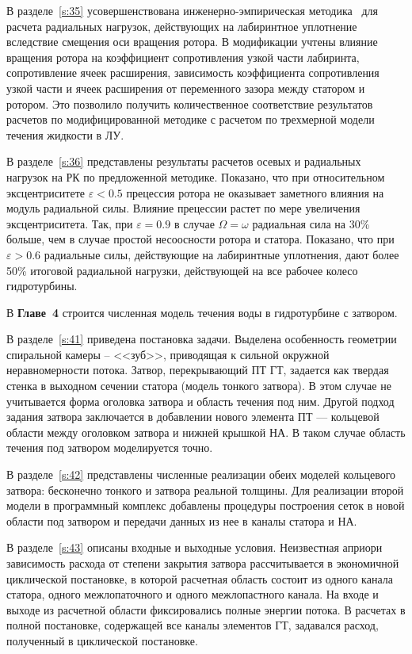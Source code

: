 В разделе~\ref{s:35} усовершенствована инженерно-эмпирическая методика~\cite{lomakin} для расчета радиальных
нагрузок, действующих на лабиринтное уплотнение вследствие смещения оси вращения ротора. В модификации 
учтены влияние вращения ротора на коэффициент сопротивления узкой части лабиринта, сопротивление 
ячеек расширения, зависимость коэффициента сопротивления узкой части и ячеек расширения от переменного зазора 
между статором и ротором. Это позволило получить количественное соответствие результатов 
расчетов по модифицированной методике с расчетом по трехмерной модели течения жидкости в ЛУ.

В разделе~\ref{s:36} представлены результаты расчетов осевых и радиальных нагрузок на РК по предложенной 
методике. Показано, что при относительном эксцентриситете $\varepsilon < 0.5$ прецессия ротора не оказывает 
заметного влияния на модуль радиальной силы. Влияние прецессии растет по мере увеличения эксцентриситета. 
Так, при $\varepsilon = 0.9$ в случае $\Omega = \omega$ радиальная сила на 30\% больше, чем в случае простой 
несоосности ротора и статора. Показано, что при $\varepsilon > 0.6$ радиальные силы, действующие на 
лабиринтные уплотнения, дают более 50\% итоговой радиальной нагрузки, действующей на все рабочее колесо 
гидротурбины.

В \textbf{Главе~4} строится численная модель течения воды в гидротурбине с затвором. 

В разделе~\ref{s:41} приведена постановка задачи. Выделена особенность геометрии 
спиральной камеры -- <<зуб>>, приводящая к сильной окружной неравномерности потока. 
Затвор, перекрывающий ПТ ГТ, задается как твердая стенка в выходном сечении статора (модель тонкого затвора). 
В этом случае не учитывается форма оголовка затвора и область течения под ним. Другой подход задания 
затвора заключается в добавлении нового элемента ПТ --- кольцевой области между оголовком затвора 
и нижней крышкой НА. В таком случае область течения под затвором моделируется точно. 

В разделе~\ref{s:42} представлены численные реализации обеих моделей кольцевого затвора: 
бесконечно тонкого и затвора реальной толщины. Для реализации второй модели в программный комплекс 
добавлены процедуры построения сеток в новой области под затвором и передачи данных из нее 
в каналы статора и НА.

В разделе~\ref{s:43} описаны входные и выходные условия. Неизвестная априори зависимость расхода от 
степени закрытия затвора рассчитывается в экономичной циклической постановке, в которой расчетная область 
состоит из одного канала статора, одного межлопаточного и одного межлопастного канала. На входе и выходе из 
расчетной области фиксировались полные энергии потока. В расчетах в полной постановке, содержащей все каналы 
элементов ГТ, задавался расход, полученный в циклической постановке.


